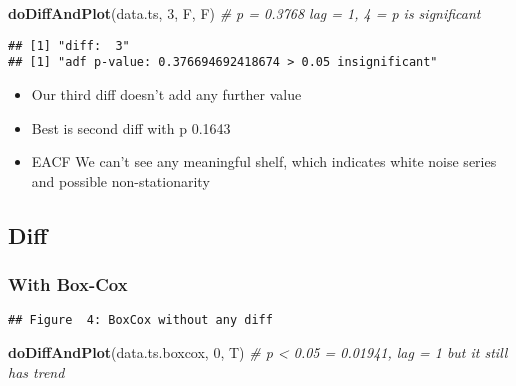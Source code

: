 \documentclass[]{article}
\newenvironment{Shaded}{\begin{snugshade}}{\end{snugshade}}
\newcommand{\CommentTok}[1]{\textcolor[rgb]{0.56,0.35,0.01}{\textit{#1}}}
\newcommand{\DecValTok}[1]{\textcolor[rgb]{0.00,0.00,0.81}{#1}}
\newcommand{\KeywordTok}[1]{\textcolor[rgb]{0.13,0.29,0.53}{\textbf{#1}}}
\newcommand{\NormalTok}[1]{#1}
\newcommand{\OperatorTok}[1]{\textcolor[rgb]{0.81,0.36,0.00}{\textbf{#1}}}
\newcommand{\StringTok}[1]{\textcolor[rgb]{0.31,0.60,0.02}{#1}}
\providecommand{\tightlist}{%
  \setlength{\itemsep}{0pt}\setlength{\parskip}{0pt}}
\begin{document}
\begin{Shaded}
\begin{Highlighting}[]
\KeywordTok{doDiffAndPlot}\NormalTok{(data.ts, }\DecValTok{3}\NormalTok{, F, F) }\CommentTok{# p = 0.3768 lag = 1, 4 = p is significant}
\end{Highlighting}
\end{Shaded}

\begin{verbatim}
## [1] "diff:  3"
## [1] "adf p-value: 0.376694692418674 > 0.05 insignificant"
\end{verbatim}

\begin{itemize}
\tightlist
\item
  Our third diff doesn't add any further value
\item
  Best is second diff with p 0.1643
\item
  EACF We can't see any meaningful shelf, which indicates white noise
  series and possible non-stationarity
\end{itemize}

\hypertarget{diff-1}{%
\subsection{Diff}\label{diff-1}}

\hypertarget{with-box-cox}{%
\subsubsection{With Box-Cox}\label{with-box-cox}}

\begin{Shaded}
\end{Shaded}

\begin{verbatim}
## Figure  4: BoxCox without any diff
\end{verbatim}

\begin{Shaded}
\begin{Highlighting}[]
\KeywordTok{doDiffAndPlot}\NormalTok{(data.ts.boxcox, }\DecValTok{0}\NormalTok{, T) }\CommentTok{# p < 0.05 = 0.01941, lag = 1 but it still has trend}
\end{Highlighting}
\end{Shaded}
\end{document}
